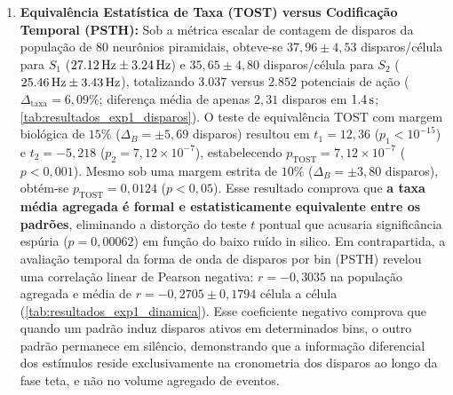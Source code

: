 \documentclass[11pt,a4paper,article,brazil]{abntex2}
\begin{document}
\begin{enumerate}
    \item \textbf{Equivalência Estatística de Taxa (TOST) versus Codificação Temporal (PSTH):} Sob a métrica escalar de contagem de disparos da população de 80 neurônios piramidais, obteve-se $37{,}96 \pm 4{,}53$ disparos/célula para $S_1$ ($\qty{27{,}12}{\hertz} \pm \qty{3{,}24}{\hertz}$) e $35{,}65 \pm 4{,}80$ disparos/célula para $S_2$ ($\qty{25{,}46}{\hertz} \pm \qty{3{,}43}{\hertz}$), totalizando $3.037$ versus $2.852$ potenciais de ação ($\Delta_{\text{taxa}} = 6{,}09\%$; diferença média de apenas $2{,}31$ disparos em $\qty{1{,}4}{\second}$; \cref{tab:resultados_exp1_disparos}). O teste de equivalência TOST com margem biológica de $15\%$ ($\Delta_B = \pm 5{,}69$ disparos) resultou em $t_1 = 12{,}36$ ($p_1 < 10^{-15}$) e $t_2 = -5{,}218$ ($p_2 = 7{,}12 \times 10^{-7}$), estabelecendo $p_{\text{TOST}} = 7{,}12 \times 10^{-7}$ ($p < 0{,}001$). Mesmo sob uma margem estrita de $10\%$ ($\Delta_B = \pm 3{,}80$ disparos), obtém-se $p_{\text{TOST}} = 0{,}0124$ ($p < 0{,}05$). Esse resultado comprova que \textbf{a taxa média agregada é formal e estatisticamente equivalente entre os padrões}, eliminando a distorção do teste $t$ pontual que acusaria significância espúria ($p = 0{,}00062$) em função do baixo ruído in silico. Em contrapartida, a avaliação temporal da forma de onda de disparos por bin (PSTH) revelou uma correlação linear de Pearson negativa: $r = -0{,}3035$ na população agregada e média de $r = -0{,}2705 \pm 0{,}1794$ célula a célula (\cref{tab:resultados_exp1_dinamica}). Esse coeficiente negativo comprova que quando um padrão induz disparos ativos em determinados bins, o outro padrão permanece em silêncio, demonstrando que a informação diferencial dos estímulos reside exclusivamente na cronometria dos disparos ao longo da fase teta, e não no volume agregado de eventos.
\end{enumerate}
\end{document}
